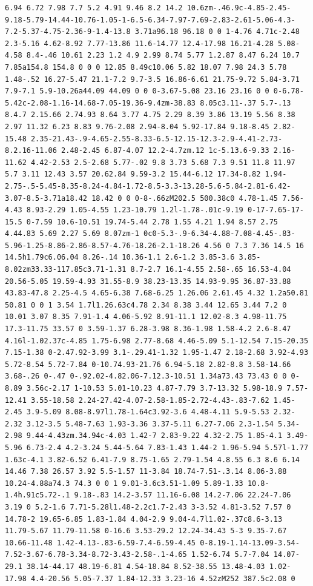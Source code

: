 \documentclass[11pt]{article}
\begin{document}
\begin{enumerate}
\begin{verbatim}
6.94 6.72 7.98 7.7 5.2 4.91 9.46 8.2 14.2 10.6zm-.46.9c-4.85-2.45-9.18-5.79-14.44-10.76-1.05-1-6.5-6.34-7.97-7.69-2.83-2.61-5.06-4.3-7.2-5.37-4.75-2.36-9-1.4-13.8 3.71a96.18 96.18 0 0 1-4.76 4.71c-2.48 2.3-5.16 4.62-8.92 7.77-13.86 11.6-14.77 12.4-17.98 16.21-4.28 5.08-4.58 8.4-.46 10.61 2.23 1.2 4.9 2.99 8.74 5.77 1.2.87 8.47 6.24 10.7 7.85a154.8 154.8 0 0 0 12.85 8.49c10.06 5.82 18.07 7.98 24.3 5.78 1.48-.52 16.27-5.47 21.1-7.2 9.7-3.5 16.86-6.61 21.75-9.72 5.84-3.71 7.9-7.1 5.9-10.26a44.09 44.09 0 0 0-3.67-5.08 23.16 23.16 0 0 0-6.78-5.42c-2.08-1.16-14.68-7.05-19.36-9.4zm-38.83 8.05c3.11-.37 5.7-.13 8.4.7 2.15.66 2.74.93 8.64 3.77 4.75 2.29 8.39 3.86 13.19 5.56 8.38 2.97 11.32 6.23 8.83 9.76-2.08 2.94-8.04 5.92-17.84 9.18-8.45 2.82-15.48 2.35-21.43-.9-4.65-2.55-8.33-6.5-12.15-12.3-2.9-4.41-2.73-8.2.16-11.06 2.48-2.45 6.87-4.07 12.2-4.7zm.12 1c-5.13.6-9.33 2.16-11.62 4.42-2.53 2.5-2.68 5.77-.02 9.8 3.73 5.68 7.3 9.51 11.8 11.97 5.7 3.11 12.43 3.57 20.62.84 9.59-3.2 15.44-6.12 17.34-8.82 1.94-2.75-.5-5.45-8.35-8.24-4.84-1.72-8.5-3.3-13.28-5.6-5.84-2.81-6.42-3.07-8.5-3.71a18.42 18.42 0 0 0-8-.66zM202.5 500.38c0 4.78-1.45 7.56-4.43 8.93-2.29 1.05-4.55 1.23-10.79 1.2l-1.78-.01c-9.19 0-17-7.65-17-15.5 0-7.59 10.6-10.51 19.74-5.44 2.78 1.55 4.21 1.94 8.57 2.75 4.44.83 5.69 2.27 5.69 8.07zm-1 0c0-5.3-.9-6.34-4.88-7.08-4.45-.83-5.96-1.25-8.86-2.86-8.57-4.76-18.26-2.1-18.26 4.56 0 7.3 7.36 14.5 16 14.5h1.79c6.06.04 8.26-.14 10.36-1.1 2.6-1.2 3.85-3.6 3.85-8.02zm33.33-117.85c3.71-1.31 8.7-2.7 16.1-4.55 2.58-.65 16.53-4.04 20.56-5.05 19.59-4.93 31.55-8.9 38.23-13.35 14.93-9.95 36.87-33.88 43.83-47.8 2.25-4.5 4.65-6.38 7.68-6.25 1.26.06 2.61.45 4.32 1.2a50.81 50.81 0 0 1 3.54 1.7l1.26.63c4.78 2.34 8.38 3.44 12.65 3.44 7.2 0 10.01 3.07 8.35 7.91-1.4 4.06-5.92 8.91-11.1 12.02-8.3 4.98-11.75 17.3-11.75 33.57 0 3.59-1.37 6.28-3.98 8.36-1.98 1.58-4.2 2.6-8.47 4.16l-1.02.37c-4.85 1.75-6.98 2.77-8.68 4.46-5.09 5.1-12.54 7.15-20.35 7.15-1.38 0-2.47.92-3.99 3.1-.29.41-1.32 1.95-1.47 2.18-2.68 3.92-4.93 5.72-8.54 5.72-7.84 0-10.74.93-21.76 6.94-5.18 2.82-8.8 3.58-14.66 3.68-.26 0-.47 0-.92.02-4.82.06-7.12.3-10.51 1.34a73.43 73.43 0 0 0-8.89 3.56c-2.17 1-10.53 5.01-10.23 4.87-7.79 3.7-13.32 5.98-18.9 7.57-12.41 3.55-18.58 2.24-27.42-4.07-2.58-1.85-2.72-4.43-.83-7.62 1.45-2.45 3.9-5.09 8.08-8.97l1.78-1.64c3.92-3.6 4.48-4.11 5.9-5.53 2.32-2.32 3.12-3.5 5.48-7.63 1.93-3.36 3.37-5.11 6.27-7.06 2.3-1.54 5.34-2.98 9.44-4.43zm.34.94c-4.03 1.42-7 2.83-9.22 4.32-2.75 1.85-4.1 3.49-5.96 6.73-2.4 4.2-3.24 5.44-5.64 7.83-1.43 1.44-2 1.96-5.94 5.57l-1.77 1.63c-4.1 3.82-6.52 6.41-7.9 8.75-1.65 2.79-1.54 4.8.55 6.3 8.6 6.14 14.46 7.38 26.57 3.92 5.5-1.57 11-3.84 18.74-7.51-.3.14 8.06-3.88 10.24-4.88a74.3 74.3 0 0 1 9.01-3.6c3.51-1.09 5.89-1.33 10.8-1.4h.91c5.72-.1 9.18-.83 14.2-3.57 11.16-6.08 14.2-7.06 22.24-7.06 3.19 0 5.2-1.6 7.71-5.28l1.48-2.2c1.7-2.43 3-3.52 4.81-3.52 7.57 0 14.78-2 19.65-6.85 1.83-1.84 4.04-2.9 9.04-4.7l1.02-.37c8.6-3.13 11.79-5.67 11.79-11.58 0-16.6 3.53-29.2 12.24-34.43 5-3 9.35-7.67 10.66-11.48 1.42-4.13-.83-6.59-7.4-6.59-4.45 0-8.19-1.14-13.09-3.54-7.52-3.67-6.78-3.34-8.72-3.43-2.58-.1-4.65 1.52-6.74 5.7-7.04 14.07-29.1 38.14-44.17 48.19-6.81 4.54-18.84 8.52-38.55 13.48-4.03 1.02-17.98 4.4-20.56 5.05-7.37 1.84-12.33 3.23-16 4.52zM252 387.5c2.08 0 
\end{verbatim}
\end{enumerate}
\end{document}
